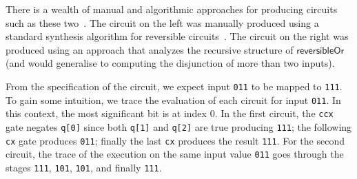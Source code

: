 There is a wealth of manual and algorithmic approaches for producing circuits such as these
two~\cite{maslovReversibleLogicSynthesis2003,shendeSynthesisReversibleLogic2003}. The circuit on the left was manually
produced using a standard synthesis algorithm for reversible circuits~\cite{millerTransformationBasedAlgorithm2003}. The
circuit on the right was produced using an approach that analyzes the recursive structure of $\mathsf{reversibleOr}$
(and would generalise to computing the disjunction of more than two inputs).

From the specification of the circuit, we expect input \verb|011| to be mapped to \verb|111|. To gain some intuition, we
trace the evaluation of each circuit for input \verb|011|. In this context, the most significant bit is at index 0. In
the first circuit, the \verb|ccx| gate negates \verb|q[0]| since both \verb|q[1]| and \verb|q[2]| are true producing
\verb|111|; the following \verb|cx| gate produces \verb|011|; finally the last \verb|cx| produces the result \verb|111|.
For the second circuit, the trace of the execution on the same input value \verb|011| goes through the stages
\verb|111|, \verb|101|, \verb|101|, and finally \verb|111|.

